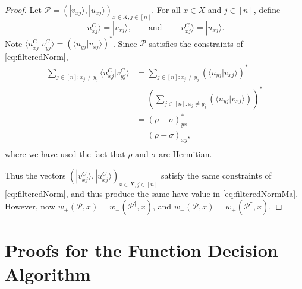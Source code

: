 \documentclass[cleveref, autoref, thm-restate,11pt]{article}
\theoremstyle{definition}
\newcommand{\ket}[1]{|#1\rangle}
\newcommand{\braket}[2]{\langle{#1}|{#2}\rangle}
\begin{document}
\complment*
\begin{proof}
Let $\mathscr P=(\ket{v_{xj}},\ket{u_{xj}})_{x\in X,j\in[n]}$.
For all $x\in X$ and $j\in[n]$,
define
\begin{equation}
\ket{u^C_{xj}}=\ket{v_{xj}}, 
\qquad \textrm{and} \qquad \ket{v^C_{xj}}=\ket{u_{xj}}.
\end{equation}
Note $\braket{u^C_{xj}}{v^C_{yj}}=(\braket{u_{yj}}{v_{xj}})^*$. Since $\mathscr P$ satisfies the constraints of \cref{eq:filteredNorm},
\begin{align}
\sum_{j\in[n]:x_j\neq y_j}\braket{u^C_{xj}}{v^C_{yj}}
&=\sum_{j\in[n]:x_j\neq y_j}(\braket{u_{yj}}{v_{xj}})^*\nonumber\\
&=\left(\sum_{j\in[n]:x_j\neq y_j}(\braket{u_{yj}}{v_{xj}})\right)^*\nonumber\\
&=(\rho-\sigma)_{yx}^*\nonumber\\
&=(\rho-\sigma)_{xy},\nonumber\\
\end{align}
where we have used the fact that $\rho$ and $\sigma$ are Hermitian.

Thus the vectors $(\ket{v_{xj}^C},\ket{u_{xj}^C})_{x\in X,j\in[n]}$ satisfy the same constraints of \cref{eq:filteredNorm}, and thus produce the same have value in
\cref{eq:filteredNormMa}. However, now $w_+(\mathscr P,x)=w_-(\mathscr P^\dagger,x)$, and
$w_-(\mathscr P,x)=w_+(\mathscr P^\dagger,x)$.
\end{proof}





\section{Proofs for the Function Decision Algorithm}\label{app:func_proof}




\phaseEstEarly*
\end{document}
